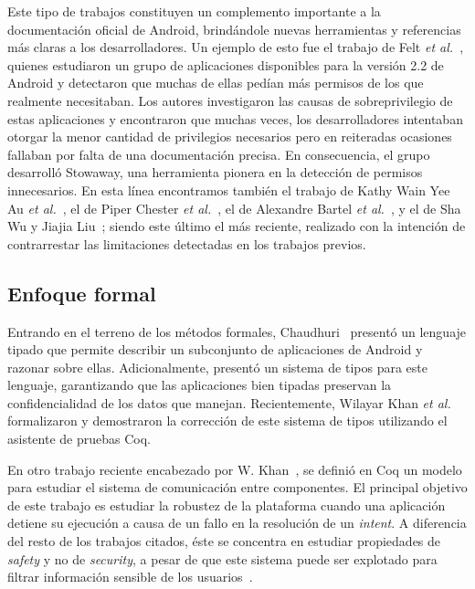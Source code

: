 Este tipo de trabajos constituyen un complemento importante a la documentación
oficial de Android, brindándole nuevas herramientas y referencias más claras a
los desarrolladores. Un ejemplo de esto fue el trabajo de Felt \textit{et
al.}~\cite{felt}, quienes estudiaron un grupo de aplicaciones disponibles para
la versión 2.2 de Android y detectaron que muchas de ellas pedían más permisos
de los que realmente necesitaban. Los autores investigaron las causas de
sobreprivilegio de estas aplicaciones y encontraron que muchas veces, los
desarrolladores intentaban otorgar la menor cantidad de privilegios necesarios
pero en reiteradas ocasiones fallaban por falta de una documentación precisa. En
consecuencia, el grupo desarrolló Stowaway, una herramienta pionera en la
detección de permisos innecesarios. En esta línea encontramos también el trabajo
de Kathy Wain Yee Au \textit{et al.}~\cite{pscout}, el de Piper Chester
\textit{et al.}~\cite{mperm}, el de Alexandre Bartel \textit{et
al.}~\cite{bartel}, y el de Sha Wu y Jiajia Liu~\cite{droidtector}; siendo este
último el más reciente, realizado con la intención de contrarrestar las
limitaciones detectadas en los trabajos previos.
%
%

\subsection*{Enfoque formal}

Entrando en el terreno de los métodos formales, Chaudhuri~\cite{chaudhuri}
presentó un lenguaje tipado que permite describir un subconjunto de aplicaciones
de Android y razonar sobre ellas. Adicionalmente, presentó un sistema de tipos
para este lenguaje, garantizando que las aplicaciones bien tipadas preservan la
confidencialidad de los datos que manejan. Recientemente, Wilayar Khan
\textit{et al.}~\cite{khan} formalizaron y demostraron la corrección de este
sistema de tipos utilizando el asistente de pruebas Coq.

En otro trabajo reciente encabezado por W. Khan~\cite{crashsafe}, se definió en
Coq un modelo para estudiar el sistema de comunicación entre componentes. El
principal objetivo de este trabajo es estudiar la robustez de la plataforma
cuando una aplicación detiene su ejecución a causa de un fallo en la resolución
de un \textit{intent}. A diferencia del resto de los trabajos citados, éste se
concentra en estudiar propiedades de \textit{safety} y no de \textit{security}, a
pesar de que este sistema puede ser explotado para filtrar información sensible de
los usuarios~\cite{iccta}.
%

